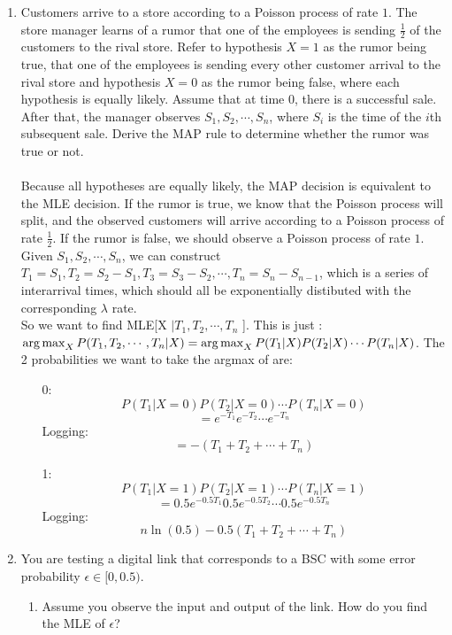 \begin{enumerate}
  \item Customers arrive to a store according to a Poisson process of rate $1$. The store manager learns of a rumor that one of the employees is sending $\frac{1}{2}$ of the customers to the rival store. Refer to hypothesis $X = 1$ as the rumor being true, that one of the employees is sending every other customer arrival to the rival store and hypothesis $X = 0$ as the rumor being false, where each hypothesis is equally likely. Assume that at time $0$, there is a successful sale. After that, the manager observes $S_1, S_2, \cdots, S_n$, where $S_i$ is the time of the $i$th subsequent sale. Derive the MAP rule to determine whether the rumor was true or not.\\\\

    Because all hypotheses are equally likely, the MAP decision is equivalent to the MLE decision. If the rumor is true, we know that the Poisson process will split, and the observed customers will arrive according to a Poisson process of rate $\frac{1}{2}$. If the rumor is false, we should observe a Poisson process of rate $1$. Given $S_1,S_2,\cdots,S_n$, we can construct $T_1 = S_1, T_2 = S_2-S_1, T_3=S_3-S_2, \cdots, T_n = S_n - S_{n-1}$, which is a series of interarrival times, which should all be exponentially distibuted with the corresponding $\lambda$ rate. \\

    So we want to find MLE[X $ | T_1,T_2, \cdots, T_n$ ]. This is just : \\
    $\operatorname*{arg\,max}_{X} P(T_1,T_2,\cdots,T_n | X) = \operatorname*{arg\,max}_{X} P(T_1 | X) P(T_2 | X) \cdots P(T_n | X)$. The 2 probabilities we want to take the argmax of are:
    \begin{enumerate}
      \item [0:]
        $$P(T_1 | X=0) P(T_2 | X=0) \cdots P(T_n | X=0)$$
        $$=e^{-T_1}e^{-T_2} \cdots e^{-T_n}$$
        Logging:
        $$=-(T_1+T_2+\cdots+T_n)$$
      \item [1:]
        $$P(T_1 | X=1) P(T_2 | X=1) \cdots P(T_n | X=1)$$        
        $$=0.5e^{-0.5T_1} 0.5e^{-0.5T_2} \cdots 0.5e^{-0.5T_n}$$
        Logging:
        $$n \ln(0.5) - 0.5(T_1 + T_2 + \cdots + T_n)$$
    \end{enumerate}
  \item You are testing a digital link that corresponds to a BSC with some error probability $\epsilon \in [0,0.5)$.
    \begin{enumerate}
      \item Assume you observe the input and output of the link. How do you find the MLE of $\epsilon$?\\\\


\end{enumerate}
\end{enumerate}
